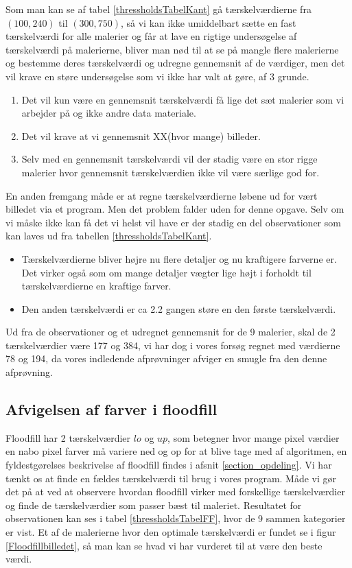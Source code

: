 Som man kan se af tabel \ref{thressholdsTabelKant} gå tærskelværdierne
fra $(100,240)$ til $(300,750)$, så vi kan ikke umiddelbart sætte en
fast tærskelværdi for alle malerier og får at lave en rigtige
undersøgelse af tærskelværdi på malerierne, bliver man nød til at se på
mangle flere malerierne  og bestemme deres tærskelværdi og
udregne gennemsnit af de værdiger, men det vil krave en støre
undersøgelse som vi ikke har valt at gøre, af 3 grunde.

\begin{enumerate}
	\item Det vil kun være en gennemsnit tærskelværdi få lige det sæt
	malerier som vi arbejder på og ikke andre data materiale.
	\item Det vil krave at vi gennemsnit XX(hvor mange) billeder. 
	\item Selv med en gennemsnit tærskelværdi vil der stadig være en stor
	rigge malerier hvor gennemsnit tærskelværdien ikke vil
være særlige god for. 
\end{enumerate}

En anden fremgang måde er at regne tærskelværdierne løbene ud for vært
billedet via et program. Men det problem falder uden for denne opgave.
Selv om vi måske ikke kan få det vi helst vil have er der stadig en del
observationer som kan laves ud fra tabellen \ref{thressholdsTabelKant}. 

\begin{itemize}
	\item Tærskelværdierne bliver højre nu flere detaljer og nu
	kraftigere farverne er. Det virker også som om mange detaljer vægter
	lige højt i forholdt til tærskelværdierne en kraftige farver. 
	\item Den anden tærskelværdi er ca 2.2 gangen støre en den første
	tærskelværdi.
\end{itemize}

Ud fra de observationer og et udregnet gennemsnit for de 9 malerier,
skal de 2 tærskelværdier være 177 og 384, vi har dog i vores forsøg
regnet med værdierne 78 og 194, da vores indledende afprøvninger afviger
en smugle fra den denne afprøvning.

\subsection{Afvigelsen af farver i floodfill}
Floodfill har 2 tærskelværdier $lo$ og $up$, som betegner hvor mange
pixel værdier en nabo pixel farver må variere ned og op for at blive tage med af algoritmen, en
fyldestgørelses beskrivelse af floodfill findes i afsnit
\ref{section_opdeling}. Vi har tænkt os at finde en fældes tærskelværdi til
brug i vores program. Måde vi gør det på at ved at observere hvordan
floodfill virker med forskellige tærskelværdier og finde de
tærskelværdier som passer bæst til maleriet. Resultatet for
observationen kan ses i tabel \ref{thressholdsTabelFF}, hvor de 9 sammen
kategorier er vist. Et af de malerierne hvor den optimale tærskelværdi
er fundet se i figur \ref{Floodfillbilledet}, så man kan se hvad vi har
vurderet til at være den beste værdi.

